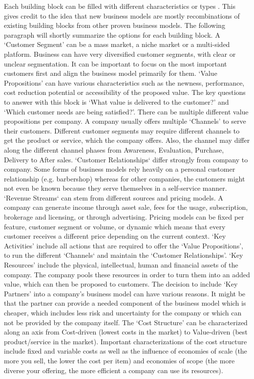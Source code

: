 		Each building block can be filled with different characteristics or types \cite{osterwalder}. This gives credit to the idea that new business models are mostly recombinations of existing building blocks from other proven business models. The following paragraph will shortly summarize the options for each building block. A `Customer Segment' can be a mass market, a niche market or a multi-sided platform. Business can have very diversified customer segments, with clear or unclear segmentation. It can be important to focus on the most important customers first and align the business model primarily for them. `Value Propositions' can have various characteristics such as the newness, performance, cost reduction potential or accessibility of the proposed value. The key questions to answer with this block is `What value is delivered to the customer?' and `Which customer needs are being satisfied?'. There can be multiple different value propositions per company. A company usually offers multiple `Channels' to serve their customers. Different customer segments may require different channels to get the product or service, which the company offers. Also, the channel may differ along the different channel phases from Awareness, Evaluation, Purchase, Delivery to After sales. `Customer Relationships` differ strongly from company to company. Some forms of business models rely heavily on a personal customer relationship (e.g. barbershop) whereas for other companies, the customers might not even be known because they serve themselves in a self-service manner. `Revenue Streams` can stem from different sources and pricing models. A company can generate income through asset sale, fees for the usage, subscription, brokerage and licensing, or through advertising. Pricing models can be fixed per feature, customer segment or volume, or dynamic which means that every customer receives a different price depending on the current context. `Key Activities' include all actions that are required to offer the `Value Propositions', to run the different `Channels` and maintain the `Customer Relationships'. `Key Resources' include the physical, intellectual, human and financial assets of the company. The company pools these resources in order to turn them into an added value, which can then be proposed to customers. The decision to include `Key Partners' into a company's business model can have various reasons. It might be that the partner can provide a needed component of the business model which is cheaper, which includes less risk and uncertainty for the company or which can not be provided by the company itself. The `Cost Structure' can be characterized along an axis from Cost-driven (lowest costs in the market) to Value-driven (best product/service in the market). Important characterizations of the cost structure include fixed and variable costs as well as the influence of economies of scale (the more you sell, the lower the cost per item) and economies of scope (the more diverse your offering, the more efficient a company can use its resources).
\vspace{-1em}
